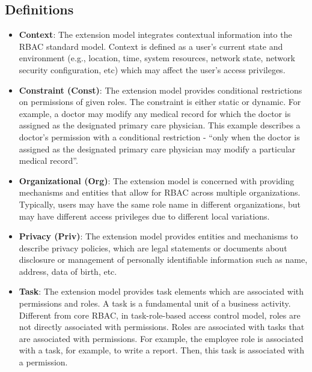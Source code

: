 \subsection{Definitions}

\begin{itemize}

  \item \textbf{Context}: The extension model integrates contextual information into the RBAC standard model. Context is defined as a user's current state and environment (e.g., location, time, system resources, network state, network security configuration, etc) which may affect the user's access privileges.

  \item \textbf{Constraint (Const)}: The extension model provides conditional restrictions on permissions of given roles. The constraint is either static or dynamic. For example, a doctor may modify any medical record for which the doctor is assigned as the designated primary care physician. This example describes a doctor's permission with a conditional restriction - ``only when the doctor is assigned as the designated primary care physician may modify a particular medical record''.

  \item \textbf{Organizational (Org)}: The extension model is concerned with providing mechanisms and entities that allow for RBAC across multiple organizations. Typically, users may have the same role name in different organizations, but may have different access privileges due to different local variations.
  
  \item \textbf{Privacy (Priv)}: The extension model provides entities and mechanisms to describe privacy policies, which are legal statements or documents about disclosure or management of personally identifiable information such as name, address, data of birth, etc.
  
  \item \textbf{Task}: The extension model provides task elements which are associated with permissions and roles. A task is a fundamental unit of a business activity. Different from core RBAC, in task-role-based access control model, roles are not directly associated with permissions. Roles are associated with tasks that are associated with permissions. For example, the employee role is associated with a task, for example, to write a report. Then, this task is associated with a permission.


\end{itemize}
